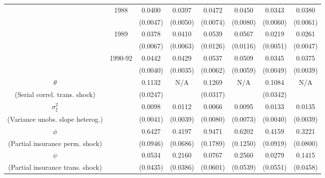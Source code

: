 \begin{table}
\begin{center}
{\begin{tabular}{cccc|cc|cc}
\\  & 1988 & 0.0400 &   0.0397 & 0.0472 &   0.0450 & 0.0343 &   0.0380
\\  &                    & (0.0047) & (0.0050)  & (0.0074) & (0.0080)  & (0.0060) & (0.0061) 
\\  & 1989 & 0.0378 &   0.0410 & 0.0539 &   0.0567 & 0.0219 &   0.0261
\\  &                    & (0.0067) & (0.0063)  & (0.0126) & (0.0116)  & (0.0051) & (0.0047) 
\\  & 1990-92 & 0.0442 &   0.0429 & 0.0537 &   0.0509 & 0.0345 &   0.0375 
\\  &         & (0.0040) & (0.0035) & (0.0062) & (0.0059) & (0.0049) & (0.0039) 
\\ \hline  
 $\theta$ &     & 0.1132 &   N/A & 0.1269 &   N/A & 0.1084 &   N/A 
\\ (Serial correl. trans. shock) &     & (0.0247) &  & (0.0317) &  & (0.0342) &  
\\ $\sigma^2_{\xi}$ &     & 0.0098 &   0.0112 & 0.0066 &   0.0095 & 0.0133 &   0.0135 
\\ (Variance unobs. slope heterog.) &     & (0.0041) & (0.0039) & (0.0080) & (0.0073) & (0.0040) & (0.0039) 
\\ \hline  
 $\phi$ &     & 0.6427 &   0.4197 & 0.9471 &   0.6202 & 0.4159 &   0.3221 
\\ (Partial insurance perm. shock) &     & (0.0946) & (0.0686) & (0.1789) & (0.1250) & (0.0919) & (0.0800) 
\\ $\psi$ &     & 0.0534 &   0.2160 & 0.0767 &   0.2560 & 0.0279 &   0.1415 
\\ (Partial insurance trans. shock) &     & (0.0435) & (0.0386) & (0.0601) & (0.0539) & (0.0551) & (0.0458) 
\\ \hline  
 \end{tabular}   
 } 
 \usebox{\ReplicationTable}  
\settowidth\TableWidth{\usebox{\ReplicationTable}} %
\end{center}  
\end{table}  
